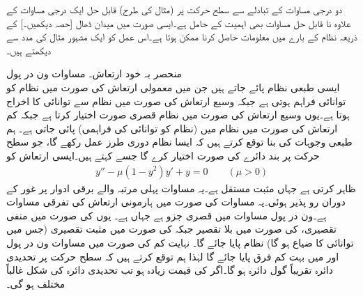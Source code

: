 دو درجی مساوات کے تبادلے سے سطح حرکت پر (مثال  کی طرح) قابل حل ایک درجی مساوات کے علاوہ نا قابل حل مساوات بھی اہمیت کے حامل ہے۔ایسی صورت میں میدان ڈھال [حصہ  دیکھیں۔] کے ذریعہ نظام کے بارے میں معلومات حاصل کرنا ممکن ہوتا ہے۔اس عمل کو ایک مشہور مثال کی مدد سے دیکھتے ہیں۔

\quad منحصر بہ خود ارتعاش۔ مساوات ون در پول\\
ایسی طبعی نظام پائے جاتے ہیں جن میں معمولی ارتعاش کی صورت میں نظام کو توانائی فراہم ہوتی ہے جبکہ وسیع ارتعاش کی صورت میں نظام سے توانائی کا اخراج ہوتا ہے۔یوں وسیع ارتعاش کی صورت میں نظام قصری صورت اختیار کرتا ہے جبکہ کم ارتعاش کی صورت میں نظام میں  (نظام کو توانائی کی فراہمی) پائی جاتی ہے۔ ہم طبعی وجوہات کی بنا توقع کرتے ہیں کہ ایسا نظام دوری طرز عمل رکھے گا، جو سطح حرکت پر بند دائرے کی صورت اختیار کرے گا جسے   کہتے ہیں۔ایسی ارتعاش کو  
\begin{align}\label{مساوات_نظام_ون_در_پول}
y''-\mu(1-y^2)y'+y=0\quad \quad (\mu >0)
\end{align}
ظاہر کرتی ہے جہاں  مثبت مستقل ہے۔یہ مساوات پہلی مرتبہ  والے برقی ادوار پر غور کے دوران رو پذیر ہوئی۔یہ مساوات  کی صورت میں ہارمونی ارتعاش کی تفرقی مساوات  ہے۔ون در پول مساوات میں قصری جزو  ہے جہاں  ہے۔ یوں  کی صورت میں منفی تقصیری،  کی صورت میں بلا تقصیر جبکہ  کی صورت میں مثبت تقصیری (جس میں توانائی کا ضیاع ہو گا) نظام پایا جائے گا۔ نہایت کم  کی صورت میں مساوات ون در پول اور  میں بہت کم فرق پایا جائے گا لہٰذا ہم توقع کرتے ہیں کہ سطح حرکت پر تحدیدی دائرہ تقریباً گول دائرہ ہو گا۔اگر  کی قیمت زیادہ ہو تب تحدیدی دائرہ کی شکل غالباً مختلف ہو گی۔

